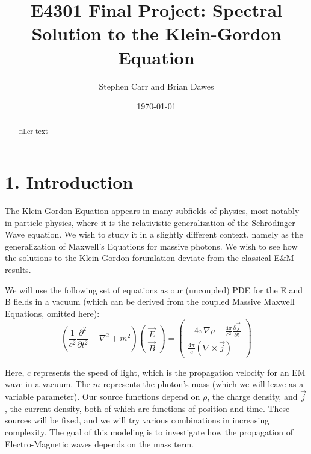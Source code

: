 \documentclass{article}
\begin{document}
	\title{E4301 Final Project: Spectral Solution to the Klein-Gordon Equation}
	\author{Stephen Carr and Brian Dawes}
	\date{\today}
	\maketitle
	
	\begin{abstract}
		filler text
	\end{abstract}
	
	\section*{1. Introduction}
	
	
	The Klein-Gordon Equation appears in many subfields of physics, most notably in particle physics, where it is the relativistic generalization of the Schr\"odinger Wave equation. We wish to study it in a slightly different context, namely as the generalization of Maxwell's Equations for massive photons. We wish to see how the solutions to the Klein-Gordon forumlation deviate from the classical E\&M results.
	
	We will use the following set of equations as our (uncoupled) PDE for the E and B fields in a vacuum (which can be derived from the coupled Massive Maxwell Equations, omitted here):
	\begin{equation}
	\boxed{
		\left(\frac{1}{c^2}\frac{\partial^2}{\partial t^2} - \nabla^2 + m^2\right)
		\begin{pmatrix}
		\vec{E} \\
		\vec{B}
		\end{pmatrix}
		=
		\begin{pmatrix}
		-4\pi\nabla\rho - \frac{4\pi}{c^2}\frac{\partial\vec{j}}{\partial t} \\
		\frac{4\pi}{c}(\nabla\times\vec{j})
		\end{pmatrix}
	}
	\end{equation}
	
	Here, $c$ represents the speed of light, which is the propagation velocity for an EM wave in a vacuum. The $m$ represents the photon's mass (which we will leave as a variable parameter). Our source functions depend on $\rho$, the charge density, and $\vec{j}$, the current density, both of which are functions of position and time. These sources will be fixed, and we will try various combinations in increasing complexity. The goal of this modeling is to investigate how the propagation of Electro-Magnetic waves depends on the mass term.
\end{document}
